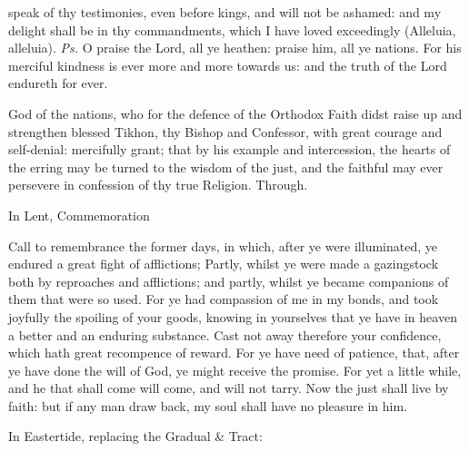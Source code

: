 \introit
{} speak of thy testimonies, even before kings, and will not be ashamed: and my delight shall be in thy commandments, which I have loved exceedingly (Alleluia, alleluia). \textit{Ps.} O praise the Lord, all ye heathen: praise him, all ye nations. For his merciful kindness is ever more and more towards us: and the truth of the Lord endureth for ever.

\collect
 God of the nations, who for the defence of the Orthodox Faith didst raise up and strengthen blessed Tikhon, thy Bishop and Confessor, with great courage and self-denial: mercifully grant; that by his example and intercession, the hearts of the erring may be turned to the wisdom of the just, and the faithful may ever persevere in confession of thy true Religion. Through.
\begin{rubric}
    In Lent, Commemoration %
\end{rubric}

 Call to remembrance the former days, in which, after ye were illuminated, ye endured a great fight of afflictions; Partly, whilst ye were made a gazingstock both by reproaches and afflictions; and partly, whilst ye became companions of them that were so used. For ye had compassion of me in my bonds, and took joyfully the spoiling of your goods, knowing in yourselves that ye have in heaven a better and an enduring substance. Cast not away therefore your confidence, which hath great recompence of reward. For ye have need of patience, that, after ye have done the will of God, ye might receive the promise. For yet a little while, and he that shall come will come, and will not tarry. Now the just shall live by faith: but if any man draw back, my soul shall have no pleasure in him.


\begin{rubric}
{In Eastertide, replacing the Gradual \& Tract:}
\end{rubric}\par\noindent

